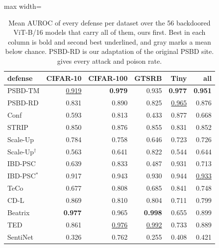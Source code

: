 \begin{table}[htbp]
\centering
\small
\caption{Mean AUROC of every defense per dataset over the 56 backdoored ViT-B/16 models that carry all of them, ours first. Best in each column is bold and second best underlined, and gray marks a mean below chance. PSBD-RD is our adaptation of the original PSBD site.  gives every attack and poison rate.}
\label{tab:detectors-summary}
\begin{adjustbox}{max width=\linewidth}
\begin{tabular}{lrrrrr}
\toprule
defense & CIFAR-10 & CIFAR-100 & GTSRB & Tiny & all \\
\midrule
PSBD-TM & \underline{0.919} & \textbf{0.979} & 0.935 & \textbf{0.977} & \textbf{0.951} \\
PSBD-RD & 0.831 & 0.890 & 0.825 & \underline{0.965} & 0.876 \\
Conf & 0.593 & 0.813 & \textcolor{black!45}{0.433} & 0.877 & 0.668 \\
STRIP & 0.850 & 0.876 & 0.855 & 0.831 & 0.852 \\
Scale-Up & 0.784 & 0.758 & 0.646 & 0.723 & 0.726 \\
Scale-Up$^\dagger$ & 0.563 & 0.641 & 0.822 & 0.544 & 0.644 \\
IBD-PSC & 0.639 & 0.833 & \textcolor{black!45}{0.487} & 0.931 & 0.713 \\
IBD-PSC$^\ast$ & 0.917 & 0.943 & 0.930 & 0.944 & \underline{0.933} \\
TeCo & 0.677 & 0.808 & 0.685 & 0.841 & 0.748 \\
CD-L & 0.869 & 0.810 & 0.804 & 0.711 & 0.799 \\
Beatrix & \textbf{0.977} & 0.965 & \textbf{0.998} & 0.655 & 0.899 \\
TED & 0.861 & \underline{0.976} & \underline{0.992} & 0.733 & 0.889 \\
SentiNet & \textcolor{black!45}{0.326} & 0.762 & \textcolor{black!45}{0.255} & \textcolor{black!45}{0.408} & \textcolor{black!45}{0.421} \\
\bottomrule
\end{tabular}
\end{adjustbox}
\end{table}
